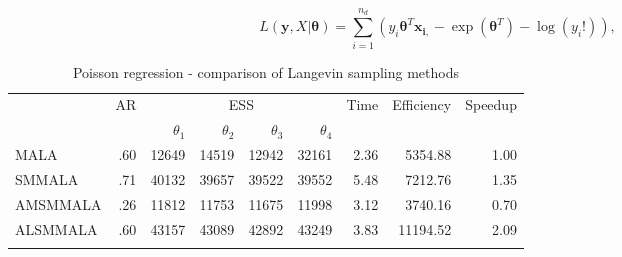 \documentclass[twoside,11pt]{article}
\begin{document}
\begin{equation}
\label{eq:poisson_logl}
L(\mathbf{y}, X | \boldsymbol{\theta})=
\sum_{i=1}^{n_d}\left(
y_i\boldsymbol{\theta}^{T}\mathbf{x_{i,}}
-\exp(\boldsymbol{\theta}^T)
-\log{(y_i!)}
\right),
\end{equation}

\begin{table}
	\caption{Poisson regression - comparison of Langevin sampling methods}
	\label{tab:poisson}
	\begin{tabular}{l|r|rrrr|r|r|r}
		\hline\noalign{\smallskip}
		\multirow{2}{*}{Method} &
		\multirow{2}{*}{AR} &
		\multicolumn{4}{c|}{ESS} &
		\multirow{2}{*}{Time} &
		\multirow{2}{*}{Efficiency} &
		\multirow{2}{*}{Speedup} \\
		& & $\theta_1$ & $\theta_2$ & $\theta_3$ & $\theta_4$ & & & \\
		\noalign{\smallskip}\hline\noalign{\smallskip}
		MALA & .60 & 12649 & 14519 & 12942 & 32161 & 2.36 & 5354.88 & 1.00 \\
		SMMALA & .71 & 40132 & 39657 & 39522 & 39552 & 5.48 & 7212.76 & 1.35 \\
		AMSMMALA & .26 & 11812 & 11753 & 11675 & 11998 & 3.12 & 3740.16 & 0.70 \\
		ALSMMALA & .60 & 43157 & 43089 & 42892 & 43249 & 3.83 & 11194.52 & 2.09 \\
		\noalign{\smallskip}\hline
	\end{tabular}
\end{table}
\end{document}
